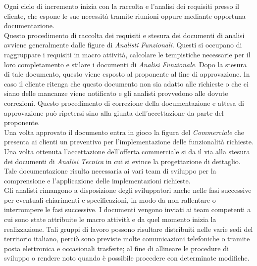 	Ogni ciclo di incremento inizia con la raccolta e l'analisi dei requisiti presso il cliente, che espone le sue necessità tramite riunioni oppure mediante opportuna documentazione.\\
	
	Questo procedimento di raccolta dei requisiti e stesura dei documenti di analisi avviene generalmente dalle figure di \textit{Analisti Funzionali}. Questi si occupano di raggruppare i requisiti in macro attività, calcolare le tempistiche necessarie per il loro completamento e stilare i documenti di \textit{Analisi Funzionale}. Dopo la stesura di tale documento, questo viene esposto al proponente al fine di approvazione. In caso il cliente ritenga che questo documento non sia adatto alle richieste o che ci siano delle mancanze viene notificato e gli analisti provvedono alle dovute correzioni. Questo procedimento di correzione della documentazione e attesa di approvazione può ripetersi sino alla giunta dell'accettazione da parte del proponente.\\
	
	Una volta approvato il documento entra in gioco la figura del \textit{Commerciale} che presenta ai clienti un preventivo per l'implementazione delle funzionalità richieste.\\ %
	
	Una volta ottenuta l'accettazione dell'offerta commerciale si da il via alla stesura dei documenti di \textit{Analisi Tecnica} in cui si evince la progettazione di dettaglio. Tale documentazione risulta necessaria ai vari team di sviluppo per la comprensione e l'applicazione delle implementazioni richieste.\\
	
	Gli analisti rimangono a disposizione degli sviluppatori anche nelle fasi successive per eventuali chiarimenti e specificazioni, in modo da non rallentare o interrompere le fasi successive. I documenti vengono inviati ai team competenti a cui sono state attribuite le macro attività e da quel momento inizia la realizzazione. Tali gruppi di lavoro possono risultare distribuiti nelle varie sedi del territorio italiano, perciò sono previste molte comunicazioni telefoniche o tramite posta elettronica e occasionali trasferte; al fine di allineare le procedure di sviluppo o rendere noto quando è possibile procedere con determinate modifiche. \\
	
